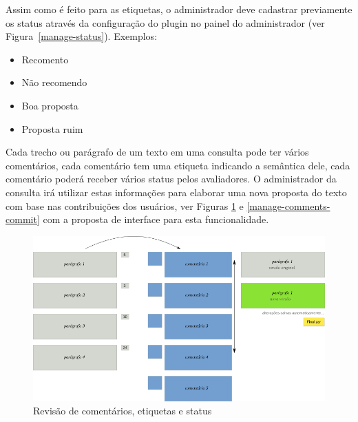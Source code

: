 \documentclass[12pt]{article}
\begin{document}
Assim como é feito para as etiquetas, o administrador deve cadastrar
previamente os status através da configuração do plugin no painel do
administrador (ver Figura~\ref{manage-status}). Exemplos:

\begin{itemize}
  \item Recomento
  \item Não recomendo
  \item Boa proposta
  \item Proposta ruim
\end{itemize}

Cada trecho ou parágrafo de um texto em uma consulta pode ter vários
comentários, cada comentário tem uma etiqueta indicando a semântica dele, cada
comentário poderá receber vários status pelos avaliadores. O
administrador da consulta irá utilizar estas informações para elaborar uma
nova proposta do texto com base nas contribuições dos usuários, ver Figuras
\ref{manage-comments} e \ref{manage-comments-commit} com a proposta de interface
para esta funcionalidade.

\begin{figure}[h]
\center
\includegraphics[scale=0.3]{manage-comments.png}
\caption{Revisão de comentários, etiquetas e status}
\label{manage-comments}
\end{figure}
\end{document}
